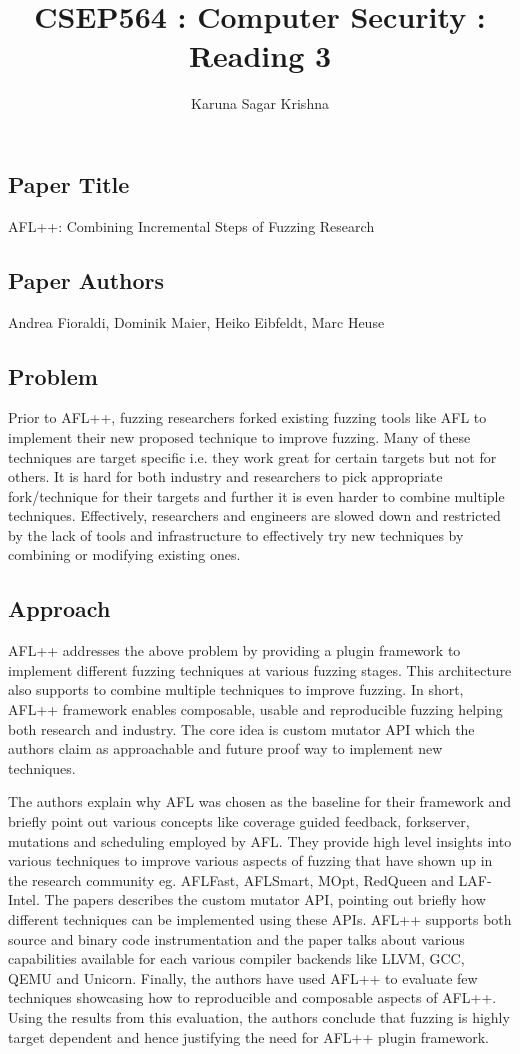 \documentclass[12pt]{article}
\title{CSEP564 : Computer Security : Reading 3}
\author{Karuna Sagar Krishna}
\begin{document}
    \maketitle

    \subsection*{Paper Title}
    AFL++: Combining Incremental Steps of Fuzzing Research

    \subsection*{Paper Authors}
    Andrea Fioraldi, Dominik Maier, Heiko Eibfeldt, Marc Heuse

    \subsection*{Problem}
    Prior to AFL++, fuzzing researchers forked existing fuzzing tools like AFL to implement their new proposed technique to improve fuzzing. Many of these techniques are target specific i.e. they work great for certain targets but not for others. It is hard for both industry and researchers to pick appropriate fork/technique for their targets and further it is even harder to combine multiple techniques. Effectively, researchers and engineers are slowed down and restricted by the lack of tools and infrastructure to effectively try new techniques by combining or modifying existing ones.

    \subsection*{Approach}
    AFL++ addresses the above problem by providing a plugin framework to implement different fuzzing techniques at various fuzzing stages. This architecture also supports to combine multiple techniques to improve fuzzing. In short, AFL++ framework enables composable, usable and reproducible fuzzing helping both research and industry. The core idea is custom mutator API which the authors claim as approachable and future proof way to implement new techniques.

    The authors explain why AFL was chosen as the baseline for their framework and briefly point out various concepts like coverage guided feedback, forkserver, mutations and scheduling employed by AFL. They provide high level insights into various techniques to improve various aspects of fuzzing that have shown up in the research community eg. AFLFast, AFLSmart, MOpt, RedQueen and LAF-Intel. The papers describes the custom mutator API, pointing out briefly how different techniques can be implemented using these APIs. AFL++ supports both source and binary code instrumentation and the paper talks about various capabilities available for each various compiler backends like LLVM, GCC, QEMU and Unicorn. Finally, the authors have used AFL++ to evaluate few techniques showcasing how to reproducible and composable aspects of AFL++. Using the results from this evaluation, the authors conclude that fuzzing is highly target dependent and hence justifying the need for AFL++ plugin framework.
    
\end{document}
